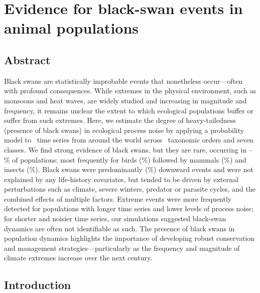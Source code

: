 \chapter[Ecological black swans]{Evidence for black-swan events in animal
  populations\footnotemark[3]}


\section{Abstract}

Black swans are statistically improbable events that nonetheless occur---often
with profound consequences. While extremes in the physical environment, such
as monsoons and heat waves, are widely studied and increasing in magnitude and
frequency, it remains unclear the extent to which ecological populations
buffer or suffer from such extremes. Here, we estimate the degree of
heavy-tailedness (presence of black swans) in ecological process noise by
applying a probability model to \NPops~time series from around the world
across \NOrders~taxonomic orders and seven classes. We find strong evidence of
black swans, but they are rare, occurring in
\overallMinPerc--\overallMaxPerc\% of populations: most frequently for birds
(\AvesRangePerc\%) followed by mammals (\MammaliaRangePerc\%) and insects
(\InsectaRangePerc\%). Black swans were predominantly (\percBSDown \%)
downward events and were not explained by any life-history covariates, but
tended to be driven by external perturbations such as climate, severe winters,
predator or parasite cycles, and the combined effects of multiple factors.
Extreme events were more frequently detected for populations with longer time
series and lower levels of process noise; for shorter and noisier time series,
our simulations suggested black-swan dynamics are often not identifiable as
such. The presence of black swans in population dynamics highlights the
importance of developing robust conservation and management
strategies---particularly as the frequency and magnitude of climate extremes
increase over the next century.

\section{Introduction}

